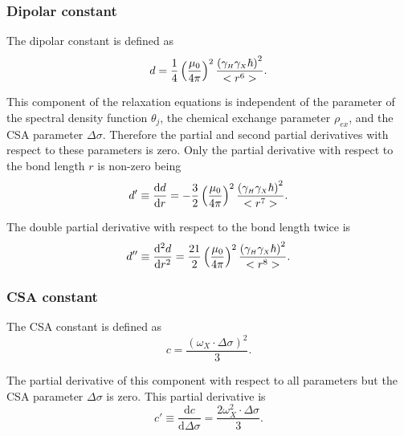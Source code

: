 \subsubsection{Dipolar constant}

The dipolar constant is defined as
\begin{equation}
    d = \frac{1}{4} \left(\frac{\mu_0}{4\pi}\right)^2 \frac{\left( \gamma_{\scriptscriptstyle H} \gamma_{\scriptscriptstyle X} \hbar \right)^2}{<r^6>}. \label{eq: Ri': d}
\end{equation}

\noindent This component of the relaxation equations is independent of the parameter of the spectral density function $\theta_j$, the chemical exchange parameter $\rho_{ex}$, and the CSA parameter $\Delta\sigma$.  Therefore the partial and second partial derivatives with respect to these parameters is zero.  Only the partial derivative with respect to the bond length $r$ is non-zero being
\begin{equation}
    d' \equiv \frac{\mathrm{d} d}{\mathrm{d} r} = - \frac{3}{2} \left(\frac{\mu_0}{4\pi}\right)^2 \frac{\left( \gamma_{\scriptscriptstyle H} \gamma_{\scriptscriptstyle X} \hbar \right)^2}{<r^7>}. \label{eq: Ri': d'}
\end{equation}

\noindent The double partial derivative with respect to the bond length twice is
\begin{equation}
    d'' \equiv \frac{\mathrm{d}^2 d}{\mathrm{d} r^2} = \frac{21}{2} \left(\frac{\mu_0}{4\pi}\right)^2 \frac{\left( \gamma_{\scriptscriptstyle H} \gamma_{\scriptscriptstyle X} \hbar \right)^2}{<r^8>}. \label{eq: Ri': d"}
\end{equation}


\subsubsection{CSA constant}

The CSA constant is defined as
\begin{equation}
    c = \frac{\left(\omega_X \cdot \Delta\sigma \right)^2}{3}. \label{eq: Ri': c}
\end{equation}

\noindent The partial derivative of this component with respect to all parameters but the CSA parameter $\Delta\sigma$ is zero.  This partial derivative is
\begin{equation}
    c' \equiv \frac{\mathrm{d} c}{\mathrm{d} \Delta\sigma} = \frac{2 \omega_X^2 \cdot \Delta\sigma}{3}. \label{eq: Ri': c'}
\end{equation}

